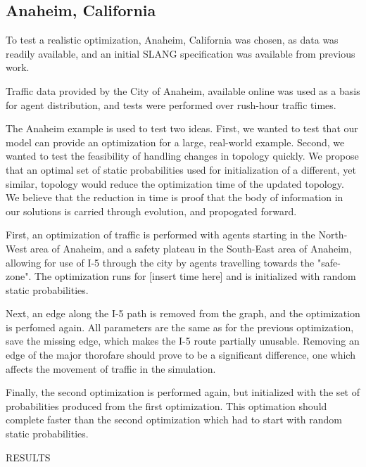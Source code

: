 \documentclass{sig-alternate-05-2015}
\begin{document}
	\subsection{Anaheim, California}
	To test a realistic optimization, Anaheim, California was chosen, as data was readily available, and an initial SLANG specification was available from previous work. 
	
	Traffic data provided by the City of Anaheim, available online \cite{anaheim2016data} was used as a basis for agent distribution, and tests were performed over rush-hour traffic times.
	
	The Anaheim example is used to test two ideas. First, we wanted to test that our model can provide an optimization for a large, real-world example. Second, we wanted to test the feasibility of handling changes in topology quickly. We propose that an optimal set of static probabilities used for initialization of a different, yet similar, topology would reduce the optimization time of the updated topology. We believe that the reduction in time is proof that the body of information in our solutions is carried through evolution, and propogated forward. 
	
	First, an optimization of traffic is performed with agents starting in the North-West area of Anaheim, and a safety plateau in the South-East area of Anaheim, allowing for use of I-5 through the city by agents travelling towards the "safe-zone". The optimization runs for [insert time here] and is initialized with random static probabilities.
	
	Next, an edge along the I-5 path is removed from the graph, and the optimization is perfomed again. All parameters are the same as for the previous optimization, save the missing edge, which makes the I-5 route partially unusable. Removing an edge of the major thorofare should prove to be a significant difference, one which affects the movement of traffic in the simulation.
	
	Finally, the second optimization is performed again, but initialized with the set of probabilities produced from the first optimization. This optimation should complete faster than the second optimization which had to start with random static probabilities. 
	
	RESULTS
\end{document}
